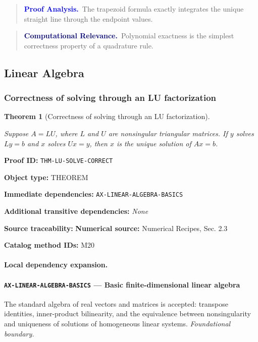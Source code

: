 \documentclass[10pt]{article}
\newcommand{\pidraw}[1]{\begingroup\urlstyle{tt}\nolinkurl{#1}\endgroup}
\newtheorem{theorem}{Theorem}[section]
\theoremstyle{definition}
\theoremstyle{remark}
\newenvironment{proofanalysis}
{\begin{quote}\small\noindent\textbf{\textcolor{blue}{Proof Analysis.}}\ }
{\end{quote}}
\newenvironment{computationalrelevance}
{\begin{quote}\small\noindent\textbf{\textcolor{navy}{Computational Relevance.}}\ }
{\end{quote}}
\newcommand{\meta}[2]{\noindent\textbf{#1:} #2\par}
\begin{document}
\begin{proofanalysis}The trapezoid formula exactly integrates the unique straight line through the endpoint values.\end{proofanalysis}

\begin{computationalrelevance}Polynomial exactness is the simplest correctness property of a quadrature rule.\end{computationalrelevance}

\subsection{Linear Algebra}

\subsubsection{Correctness of solving through an LU factorization}

\begin{theorem}[Correctness of solving through an LU factorization]\label{prf:THM-LU-SOLVE-CORRECT}

Suppose $A=LU$, where $L$ and $U$ are nonsingular triangular matrices. If $y$ solves $Ly=b$ and $x$ solves $Ux=y$, then $x$ is the unique solution of $Ax=b$.

\end{theorem}

\meta{Proof ID}{\pidraw{THM-LU-SOLVE-CORRECT}}
\meta{Object type}{THEOREM}
\meta{Immediate dependencies}{\pidraw{AX-LINEAR-ALGEBRA-BASICS}}
\meta{Additional transitive dependencies}{\emph{None}}
\meta{Source traceability}{\textbf{Numerical source:} Numerical Recipes, Sec. 2.3}
\meta{Catalog method IDs}{M20}

\paragraph{Local dependency expansion.}

\paragraph{\pidraw{AX-LINEAR-ALGEBRA-BASICS} --- Basic finite-dimensional linear algebra}
The standard algebra of real vectors and matrices is accepted: transpose identities, inner-product bilinearity, and the equivalence between nonsingularity and uniqueness of solutions of homogeneous linear systems.
\textit{Foundational boundary.}
\end{document}
